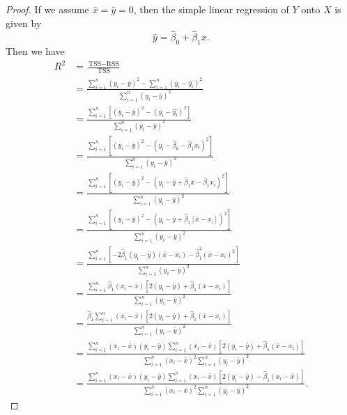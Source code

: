 \begin{proof}
    If we assume $\bar{x} = \bar{y} = 0$, then the simple linear regression of
    $Y$ onto $X$ is given by
    \[
        \hat{y} = \hat{\beta}_0 + \hat{\beta}_1 x.
    \]
    Then we have
    \begin{equation*}
        \begin{split}
            R^2 &= \frac{\text{TSS} - \text{RSS}}{\text{TSS}} \\
            &= \frac{\sum_{i=1}^{n}{(y_i - \bar{y})}^{2}
            - \sum_{i=1}^{n}{(y_i - \hat{y_i})}^{2}}
            {\sum_{i=1}^{n}{(y_i - \bar{y})}^{2}} \\
            &= \frac{\sum_{i=1}^{n}[{(y_i - \bar{y})}^{2}
            - {(y_i - \hat{y_i})}^{2}]}
            {\sum_{i=1}^{n}{(y_i - \bar{y})}^{2}} \\
            &= \frac{\sum_{i=1}^{n}[{(y_i - \bar{y})}^{2}
                - {(y_i - \hat{\beta}_0 - \hat{\beta}_1 x_i)}^{2}]}
            {\sum_{i=1}^{n}{(y_i - \bar{y})}^{2}} \\
            &= \frac{\sum_{i=1}^{n}[{(y_i - \bar{y})}^{2}
                    - {(y_i - \bar{y} + \hat{\beta}_1 \bar{x}
            - \hat{\beta}_1 x_i)}^{2}]}
            {\sum_{i=1}^{n}{(y_i - \bar{y})}^{2}} \\
            &= \frac{\sum_{i=1}^{n}[{(y_i - \bar{y})}^{2}
            - {(y_i - \bar{y} + \hat{\beta}_1 [\bar{x} - x_i])}^{2}]}
            {\sum_{i=1}^{n}{(y_i - \bar{y})}^{2}} \\
            &= \frac{\sum_{i=1}^{n}[-2\hat{\beta}_1(y_i - \bar{y})(\bar{x} - x_i)
            - \hat{\beta}_1^2{(\bar{x} - x_i)}^{2}]}
            {\sum_{i=1}^{n}{(y_i - \bar{y})}^{2}} \\
            &= \frac{\sum_{i=1}^{n}\hat{\beta}_1(x_i - \bar{x})
            [2(y_i - \bar{y}) + \hat{\beta}_1(\bar{x} - x_i)]}
            {\sum_{i=1}^{n}{(y_i - \bar{y})}^{2}} \\
            &= \frac{\hat{\beta}_1\sum_{i=1}^{n}(x_i - \bar{x})
            [2(y_i - \bar{y}) + \hat{\beta}_1(\bar{x} - x_i)]}
            {\sum_{i=1}^{n}{(y_i - \bar{y})}^{2}} \\
            &= \frac{\sum_{i=1}^{n}(x_i - \bar{x})(y_i - \bar{y})
                \sum_{i=1}^{n}(x_i - \bar{x})[2(y_i - \bar{y})
            + \hat{\beta}_1(\bar{x} - x_i)]}
            {\sum_{i=1}^{n}{(x_i - \bar{x})}^{2}\sum_{i=1}^{n}{(y_i -
            \bar{y})}^{2}} \\
            &= \frac{\sum_{i=1}^{n}(x_i - \bar{x})(y_i - \bar{y})
                \sum_{i=1}^{n}(x_i - \bar{x})[2(y_i - \bar{y})
            - \hat{\beta}_1(x_i - \bar{x})]}
            {\sum_{i=1}^{n}{(x_i - \bar{x})}^{2}\sum_{i=1}^{n}{(y_i -
            \bar{y})}^{2}}.
        \end{split}
    \end{equation*}


\end{proof}
